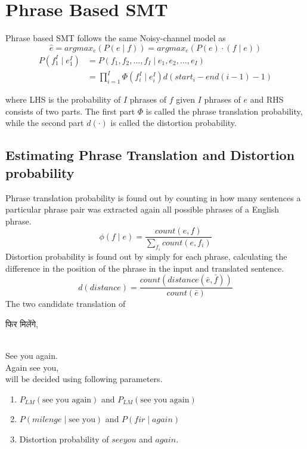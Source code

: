 \section{Phrase Based SMT}
Phrase based SMT follows the same Noisy-channel model as
\begin{equation}
\hat{e} = arg max_{e}(P(e\mid f)) = arg max_{e}(P(e)\cdot(f\mid e))
\end{equation}
\begin{align}
P(f_{1}^{I}\mid e_{1}^{I}) &= P(f_{1},f_{2},\ldots,f_{I}\mid  e_{1},e_{2},\ldots,e_{I})\nonumber \\
		   &= \prod_{i=1}^{I}\Phi(f_{i}^{I}\mid e_{i}^{I})d(start_{i}-end{(i-1)}-1)
\end{align}

where LHS is the probability of $I$ phrases of $f$ given $I$ phrases of $e$ and RHS consists of two parts. The first part $\Phi$ is called the phrase translation probability, while the second part $d(\cdot)$ is called the distortion probability. 

\subsection{Estimating Phrase Translation and Distortion probability }
Phrase translation probability is found out by counting in how many sentences a particular phrase pair was extracted again all possible phrases of a English phrase.
\begin{equation}
\phi(f\mid e) = \frac{count(e,f)}{\sum_{f_{i}}count(e,f_{i})}
\end{equation}
Distortion probability is found out by simply for each phrase, calculating the difference in the position of the phrase in the input and translated sentence.
\begin{equation}
d(distance) = \frac{count(distance(\bar{e},\bar{f}))}{count(\bar{e})}
\end{equation}
The two candidate translation of \begin{hindi} फिर मिलेंगे, \end{hindi} \\
See you again.\\
Again see you, \\
will be decided using following parameters.
\begin{enumerate}
\item $P_{LM}(\text{see you again})$ and $P_{LM}(\text{see you again})$\\
\item $P(milenge\mid \text{see you})$ and $P(fir\mid again)$ \\
\item Distortion probability of $see you$ and $again$. 
\end{enumerate}







